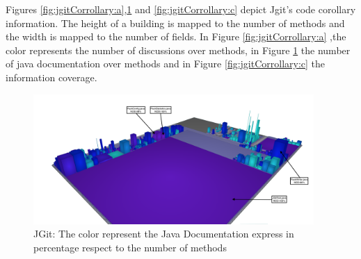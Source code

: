 \documentclass[]{usiinfbachelorproject}
\begin{document}
Figures \ref{fig:jgitCorrollary:a},\ref{fig:jgitCorrollary:b} and \ref{fig:jgitCorrollary:c} depict Jgit's code corollary information. The height of a building is mapped to the number of methods and the width is mapped to the number of fields. In  Figure \ref{fig:jgitCorrollary:a} ,the color represents  the number of discussions over methods, in Figure \ref{fig:jgitCorrollary:b} the number of java documentation over methods and in Figure \ref{fig:jgitCorrollary:c} the information coverage.
\begin{figure}[H]
	\centering
	\includegraphics[width=0.95\textwidth]{images/jgitJavaDoc}
	\caption[JGit: Java Documentation]{JGit: The color represent the Java Documentation express in percentage respect to the number of methods\label{fig:jgitCorrollary:b}}
\end{figure}
\end{document}
